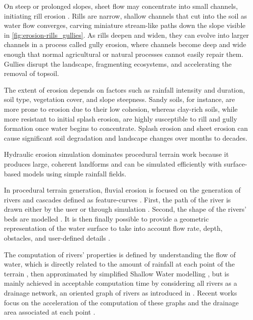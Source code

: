 On steep or prolonged slopes, sheet flow may concentrate into small channels, initiating rill erosion \cite{Gatto2000}. Rills are narrow, shallow channels that cut into the soil as water flow converges, carving miniature stream-like paths down the slope visible in \cref{fig:erosion-rills_gullies}. As rills deepen and widen, they can evolve into larger channels in a process called gully erosion, where channels become deep and wide enough that normal agricultural or natural processes cannot easily repair them. Gullies disrupt the landscape, fragmenting ecosystems, and accelerating the removal of topsoil.

The extent of erosion depends on factors such as rainfall intensity and duration, soil type, vegetation cover, and slope steepness. Sandy soils, for instance, are more prone to erosion due to their low cohesion, whereas clay-rich soils, while more resistant to initial splash erosion, are highly susceptible to rill and gully formation once water begins to concentrate. Splash erosion and sheet erosion can cause significant soil degradation and landscape changes over months to decades.

\smallConclusion

Hydraulic erosion simulation dominates procedural terrain work because it produces large, coherent landforms and can be simulated efficiently with surface-based models using simple rainfall fields.

In procedural terrain generation, fluvial erosion is focused on the generation of rivers and cascades defined as feature-curves \cite{Emilien2015}. First, the path of the river is drawn either by the user \cite{Hnaidi2010} or through simulation \cite{ParisThesis}. Second, the shape of the rivers' beds are modelled \cite{Genevaux2013}. It is then finally possible to provide a geometric representation of the water surface to take into account flow rate, depth, obstacles, and user-defined details \cite{Peytavie2019}.

The computation of rivers' properties is defined by understanding the flow of water, which is directly related to the amount of rainfall at each point of the terrain \cite{Kelley1988}, then approximated by simplified Shallow Water modelling \cite{Mei2007}, but is mainly achieved in acceptable computation time by considering all rivers as a drainage network, an oriented graph of rivers as introduced in \cite{Roudier1993}. Recent works focus on the acceleration of the computation of these graphs and the drainage area associated at each point \cite{Cordonnier2016,Schott2023}.

